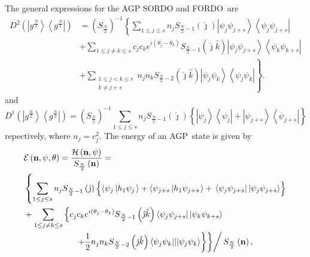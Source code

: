 \documentclass[aps,preprint]{revtex4}%
\begin{document}
The general expressions for the AGP SORDO and FORDO\ are
\begin{align*}
D^{2}\left(  \left\vert g^{\frac{N}{2}}\right\rangle \left\langle g^{\frac
{N}{2}}\right\vert \right)   &  =\left(  S_{\frac{N}{2}}\right)  ^{-1}\left\{
\sum_{1\leq j\leq s}n_{j}S_{\frac{N}{2}-1}\left(  \hat{\jmath}\right)
\left\vert \psi_{j}\psi_{j+s}\right\rangle \left\langle \psi_{j}\psi
_{j+s}\right\vert \right. \\
&  +\sum_{1\leq j\neq k\leq s}c_{j}c_{k}e^{i\left(  \theta_{j}-\theta
_{k}\right)  }S_{\frac{N}{2}-1}\left(  \hat{\jmath}\hat{k}\right)  \left\vert
\psi_{j}\psi_{j+s}\right\rangle \left\langle \psi_{k}\psi_{k+s}\right\vert \\
&  \left.  +\sum_{\substack{1\leq j<k\leq r\\k\neq j+s}}n_{j}n_{k}S_{\frac
{N}{2}-2}\left(  \hat{\jmath}\hat{k}\right)  \left\vert \psi_{j}\psi
_{k}\right\rangle \left\langle \psi_{j}\psi_{k}\right\vert \right\}  .
\end{align*}
and
\[
D^{1}\left(  \left\vert g^{\frac{N}{2}}\right\rangle \left\langle g^{\frac
{N}{2}}\right\vert \right)  =\left(  S_{\frac{N}{2}}\right)  ^{-1}\sum_{1\leq
j\leq s}n_{j}S_{\frac{N}{2}-1}\left(  \hat{\jmath}\right)  \left\{  \left\vert
\psi_{j}\right\rangle \left\langle \psi_{j}\right\vert +\left\vert \psi
_{j+s}\right\rangle \left\langle \psi_{j+s}\right\vert \right\}
\]
repectively, where $n_{j}=c_{j}^{2}$. The energy of an AGP\ state is given by
\begin{align*}
&  \mathcal{E}\left(  \mathbf{n},\mathbf{\psi,\theta}\right)  =\frac
{\mathcal{H}\left(  \mathbf{n},\mathbf{\psi}\right)  }{S_{\frac{N}{2}}\left(
\mathbf{n}\right)  }=\\
&  \left\{  \sum_{1\leq j\leq s}n_{j}S_{\frac{N}{2}-1}\left(  \hat{\jmath
}\right)  \left\{  \overset{}{\left\langle \psi_{j}\left\vert h_{1}\psi
_{j}\right.  \right\rangle +\left\langle \psi_{j+s}\left\vert h_{1}\psi
_{j+s}\right.  \right\rangle }+\,\left\langle \psi_{j}\psi_{j+s}\right\vert
\left\vert \psi_{j}\psi_{j+s}\right\rangle \right\}  \right. \\
&  +\sum_{1\leq j\neq k\leq s}\left\{  c_{j}c_{k}e^{i\left(  \theta_{j}%
-\theta_{k}\right)  }S_{\frac{N}{2}-1}\left(  \hat{\jmath}\hat{k}\right)
\left\langle \psi_{j}\psi_{j+s}\right\vert \left\vert \psi_{k}\psi
_{k+s}\right\rangle \right. \\
&  \qquad\qquad\qquad\left.  \left.  \left.  +\frac{1}{2}\overset{}{n_{j}%
n_{k}S_{\frac{N}{2}-2}\left(  \hat{\jmath}\hat{k}\right)  \left\langle
\psi_{j}\psi_{k}|||\psi_{j}\psi_{k}\right\rangle }\right\}  \right\}  \right/
S_{\frac{N}{2}}\left(  \mathbf{n}\right)  ,
\end{align*}
\end{document}
